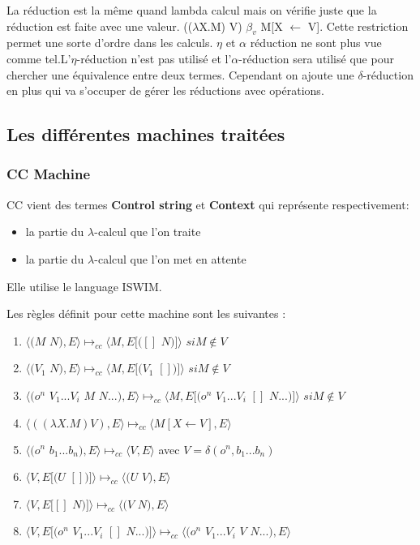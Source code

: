 \documentclass[10pt,a4paper]{article}
\begin{document}
				La réduction est la même quand lambda calcul mais on vérifie juste que la réduction est faite avec une valeur. (($\lambda$X.M) V) $\beta_{v}$ M[X $\longleftarrow$ V]. Cette restriction permet une sorte d'ordre dans les calculs.
				\smallbreak
				$\eta$ et $\alpha$ réduction ne sont plus vue comme tel.L'$\eta$-réduction n'est pas utilisé et l'$\alpha$-réduction sera utilisé que pour chercher une équivalence entre deux termes.
				\medbreak
				Cependant on ajoute une $\delta$-réduction en plus qui va s'occuper de gérer les réductions avec opérations.
				\bigbreak
				\newpage
			\subsection{Les différentes machines traitées}\label{Machine}
				\subsubsection{CC Machine}
					
					CC vient des termes \textbf{Control string} et \textbf{Context} qui représente respectivement:
					\begin{itemize}
						\item la partie du $\lambda$-calcul que l'on traite
						\item la partie du $\lambda$-calcul que l'on met en attente 
					\end{itemize}
					Elle utilise le language ISWIM.
					\bigbreak
				
					Les règles définit pour cette machine sont les suivantes :
					\begin{enumerate}
						\item $\langle(M$ $N),E\rangle \longmapsto_{cc} \langle M,E[([]$ $N)]\rangle$ $si M \notin V$
						\item $\langle(V_{1}$ $N),E\rangle \longmapsto_{cc}  \langle M,E[(V_{1}$ $[])]\rangle$ $ si M \notin V$
						\item $\langle(o^{n}$ $V_{1}...V_{i}$ $M$ $N ...),E\rangle \longmapsto_{cc}  
						\langle M,E[(o^{n}$ $V_{1}...V_{i}$ $[]$ $N ...)]\rangle$ $ si M \notin V$
						\item $\langle((\lambda X.M) V),E\rangle \longmapsto_{cc} \langle M[X\longleftarrow V],E\rangle$
						\item $\langle(o^{n}$ $b_{1}...b_{n}),E\rangle \longmapsto_{cc}  \langle V,E\rangle$ avec $V = \delta(o^{n},b_{1}...b_{n})$ 
						\item $\langle V,E[(U$ $[])]\rangle \longmapsto_{cc} \langle(U$ $V),E\rangle$ 
						\item $\langle V,E[[]$ $N)]\rangle \longmapsto_{cc} \langle(V$ $N),E\rangle$ 
						\item $\langle V,E[(o^{n}$ $V_{1}...V_{i}$ $[]$ $N ...)]\rangle \longmapsto_{cc} \langle(o^{n}$ $V_{1}...V_{i}$ $V$ $N ...),E\rangle$ 
					\end{enumerate}
					\bigbreak
					
\end{document}
